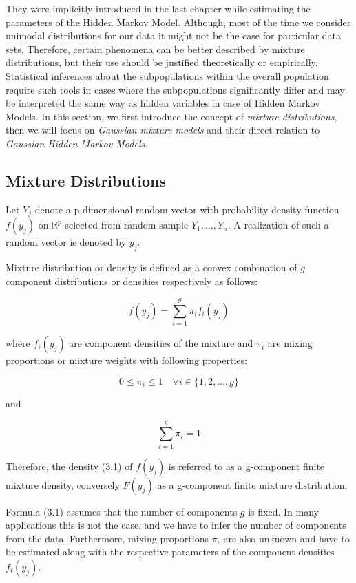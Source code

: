 They were implicitly introduced in the last chapter while estimating the parameters of the Hidden Markov Model. 
Although, most of the time we consider unimodal distributions for our data it might not be the case for particular data sets.
Therefore, certain phenomena can be better described by mixture distributions, but their use should be justified theoretically or empirically. 
Statistical inferences about the subpopulations within the overall population require such tools in cases where the subpopulations significantly differ 
and may be interpreted the same way as hidden variables in case of Hidden Markov Models.
In this section, we first introduce the concept of \textit{mixture distributions}, then we will focus on \textit{Gaussian mixture models }
and their direct relation to \textit{Gaussian Hidden Markov Models}.

\subsection{Mixture Distributions}

Let $Y_j$ denote a p-dimensional random vector with probability density function $f(y_j)$ on $\mathbb{R}^p$  
selected from random sample $Y_1,\ldots,Y_n$. A realization of such a random vector is denoted by $y_j$.

Mixture distribution or density is defined as a convex combination of $g$ component distributions or densities respectively 
as follows:

\begin{equation}
f(y_j) = \sum_{i=1}^{g} \pi_i f_i(y_j)
\end{equation}

where $f_i(y_j)$ are component densities of the mixture and $\pi_i$ are mixing proportions or mixture weights with following properties:

\begin{equation}
    0 \leq \pi_i \leq 1 \quad \forall i \in \{1,2,\ldots,g\}
\end{equation}

and

\begin{equation}
    \sum_{i=1}^{g} \pi_i = 1
\end{equation}

Therefore, the density (3.1) of $f(y_j)$ is referred to as a g-component finite mixture density, conversely $F(y_j)$ 
as a g-component finite mixture distribution. 

Formula (3.1) assumes that the number of components $g$ is fixed. In many applications this is not the case, and we have to infer 
the number of components from the data. Furthermore, mixing proportions $\pi_i$ are also unknown and have to be estimated along with 
the respective parameters of the component densities $f_i(y_j)$.


